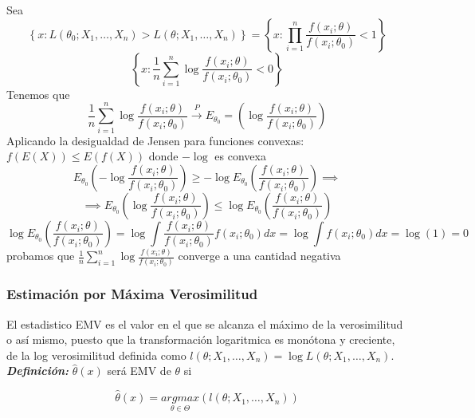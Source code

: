 \begin{proofs}
    Sea
    \[
        \left\{x:L(\theta_0;X_1,\dots,X_n)>L(\theta;X_1,\dots,X_n)\right\}=\left\{x:\prod_{i=1}^{n}\frac{f(x_i;\theta)}{f(x_i;\theta_0)}<1\right\}
    \]
    \[
        \left\{x:\frac{1}{n}\sum_{i=1}^{n}\log{\frac{f(x_i;\theta)}{f(x_i;\theta_0)}}<0\right\}
    \]
    Tenemos que
    \[
        \frac{1}{n}\sum_{i=1}^{n}\log{\frac{f(x_i;\theta)}{f(x_i;\theta_0)}} \overset{P}{\to}E_{\theta_0}=\left(\log{\frac{f(x_i;\theta)}{f(x_i;\theta_0)}}\right)
    \]
    Aplicando la desigualdad de Jensen para funciones convexas: $f(E(X)) \leq E(f(X))$ donde $-\log$ es convexa
    \[
        E_{\theta_0}\left(-\log{\frac{f(x_i;\theta)}{f(x_i;\theta_0)}}\right) \geq -\log{E_{\theta_0}\left(\frac{f(x_i;\theta)}{f(x_i;\theta_0)}\right)} \implies
    \]
    \[
        \implies E_{\theta_0}\left(\log{\frac{f(x_i;\theta)}{f(x_i;\theta_0)}}\right) \leq \log{E_{\theta_0}\left(\frac{f(x_i;\theta)}{f(x_i;\theta_0)}\right)}
    \]
    \[
        \log{E_{\theta_0}\left(\frac{f(x_i;\theta)}{f(x_i;\theta_0)}\right)}=\log\int\frac{f(x_i;\theta)}{f(x_i;\theta_0)}f(x_i;\theta_0)dx=\log\int f(x_i;\theta_0)dx=\log(1)=0
    \]
    probamos que $\frac{1}{n}\sum_{i=1}^{n}\log{\frac{f(x_i;\theta)}{f(x_i;\theta_0)}}$ converge a una cantidad negativa
\end{proofs}

\subsubsection{Estimación por Máxima Verosimilitud}

El estadistico EMV es el valor en el que se alcanza el máximo de la verosimilitud o así mismo, puesto que la transformación logaritmica es monótona y creciente, de la log verosimilitud definida como $l(\theta;X_1,\dots,X_n)=\log L(\theta;X_1,\dots,X_n)$. \\

\textbf{\textit{Definición: }} $\widehat{\theta}(x)$ será EMV de $\theta$ si

\[
    \widehat{\theta}(x) = \underset{\theta \in \Theta}{argmax}(l(\theta;X_1,\dots,X_n))
\]

